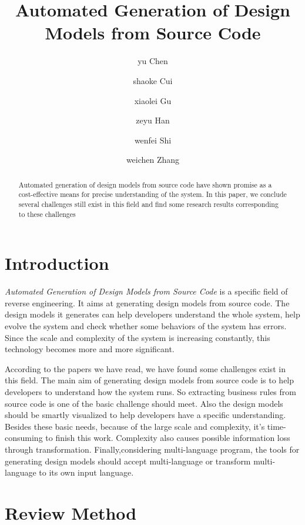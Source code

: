 \documentclass[acmsmall]{acmart}
\begin{document}
\title{Automated Generation of Design Models from Source Code}


\author{yu Chen}
\author{shaoke Cui}
\author{xiaolei Gu}
\author{zeyu Han}
\author{wenfei Shi}
\author{weichen Zhang}


\begin{abstract}
Automated generation of design models from source code have shown promise as a cost-effective means for precise understanding of the system. In this paper, we conclude several challenges still exist in this field and find some research results corresponding to these challenges
\end{abstract}


\maketitle

\section{Introduction}


{\itshape Automated Generation of Design Models from Source Code} is a specific field of reverse engineering. It aims at generating design models from source code. The design models it generates can help developers understand the whole system, help evolve the system and check whether some behaviors of the system has errors. Since the scale and complexity of the system is increasing constantly, this technology becomes more and more significant.


According to the papers we have read, we have found some challenges exist in this field. The main aim of generating design models from source code is to help developers to understand how the system runs. So extracting business rules from source code is one of the basic challenge should meet. Also the design models should be smartly visualized to help developers have a specific understanding. Besides these basic needs, because of the large scale and complexity, it's time-consuming to finish this work. Complexity also causes possible information loss through transformation. Finally,considering multi-language program, the tools for generating design models should accept multi-language or transform multi-language to its own input language.

\section{Review Method}
\end{document}
